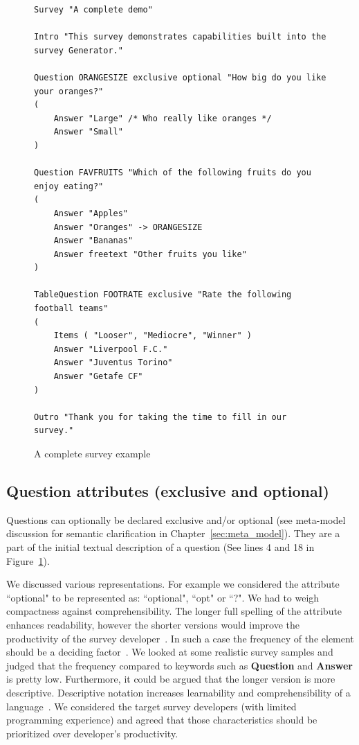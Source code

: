 \documentclass[runningheads,a4paper]{llncs}
\begin{document}
\begin{figure}[htb]
\begin{lstlisting}[language=survey]
Survey "A complete demo"

Intro "This survey demonstrates capabilities built into the survey Generator."

Question ORANGESIZE exclusive optional "How big do you like your oranges?"
(
	Answer "Large" /* Who really like oranges */
	Answer "Small"
)

Question FAVFRUITS "Which of the following fruits do you enjoy eating?"
(
	Answer "Apples"
	Answer "Oranges" -> ORANGESIZE
	Answer "Bananas"
	Answer freetext "Other fruits you like"
)

TableQuestion FOOTRATE exclusive "Rate the following football teams"
(
	Items ( "Looser", "Mediocre", "Winner" )
	Answer "Liverpool F.C."
	Answer "Juventus Torino"
	Answer "Getafe CF"
)

Outro "Thank you for taking the time to fill in our survey."
\end{lstlisting}
\caption{A complete survey example}
\label{fig:complete_survey_example}
\end{figure}

\subsection{Question attributes (exclusive and optional)}
Questions can optionally be declared exclusive and/or optional (see meta-model discussion for semantic clarification in Chapter~\ref{sec:meta_model}). They are a part of the initial textual description of a question (See lines 4 and 18 in Figure~\ref{fig:complete_survey_example}).

We discussed various representations. For example we considered the attribute ``optional" to be represented as: ``optional", ``opt" or ``?". We had to weigh compactness against comprehensibility. The longer full spelling of the attribute enhances readability, however the shorter versions would improve the productivity of the survey developer~\cite{karsai}. In such a case the frequency of the element should be a deciding factor~\cite{karsai}. We looked at some realistic survey samples and judged that the frequency compared to keywords such as \textbf{Question} and \textbf{Answer} is pretty low. Furthermore, it could be argued that the longer version is more descriptive. Descriptive notation increases learnability and comprehensibility of a language~\cite{karsai}. We considered the target survey developers (with limited programming experience) and agreed that those characteristics should be prioritized over developer's productivity.
\end{document}
